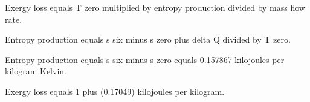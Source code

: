Exergy loss equals T zero multiplied by entropy production divided by mass flow rate.  

Entropy production equals s six minus s zero plus delta Q divided by T zero.  

Entropy production equals s six minus s zero equals 0.157867 kilojoules per kilogram Kelvin.  

Exergy loss equals 1 plus (0.17049) kilojoules per kilogram.